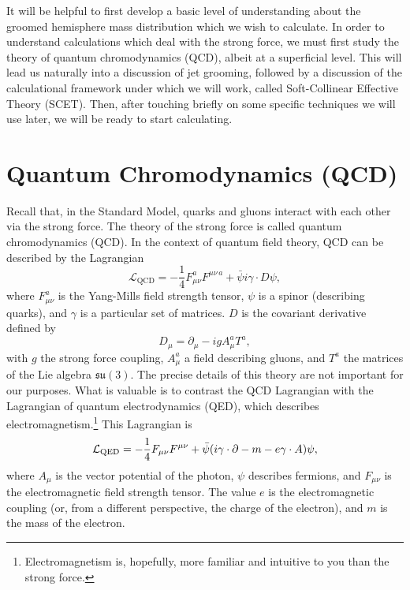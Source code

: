 \documentclass[../thesis.tex]{subfiles}
\providecommand{\cL}{\mathcal{L}}
\providecommand{\su}{\mathfrak{su}}
\begin{document}
	It will be helpful to first develop a basic level of understanding about the groomed hemisphere mass distribution which we wish to calculate. In order to understand calculations which deal with the strong force, we must first study the theory of quantum chromodynamics (QCD), albeit at a superficial level. This will lead us naturally into a discussion of jet grooming, followed by a discussion of the calculational framework under which we will work, called Soft-Collinear Effective Theory (SCET). Then, after touching briefly on some specific techniques we will use later, we will be ready to start calculating.

\section{Quantum Chromodynamics (QCD)}\label{technical-sec:QCD}
	Recall that, in the Standard Model, quarks and gluons interact with each other via the strong force. The theory of the strong force is called quantum chromodynamics (QCD). In the context of quantum field theory, QCD can be described by the Lagrangian \cite{larkoski_elementary_2019-1}
	\begin{equation}\label{technical-eq:QCD Lagrangian}
		\cL_{\mathrm{QCD}} = -\frac{1}{4} F_{\mu\nu}^a F^{\mu \nu\,a} + \bar \psi i \gamma \cdot D \psi,
	\end{equation}
	where $F_{\mu\nu}^a$ is the Yang-Mills field strength tensor, $\psi$ is a spinor (describing quarks), and $\gamma$ is a particular set of matrices. $D$ is the covariant derivative defined by
	\begin{equation}
		D_\mu = \partial_\mu - i g A_\mu^a T^a,
	\end{equation}
	with $g$ the strong force coupling, $A_\mu^a$ a field describing gluons, and $T^a$ the matrices of the Lie algebra $\su(3)$. The precise details of this theory are not important for our purposes. What is valuable is to contrast the QCD Lagrangian with the Lagrangian of quantum electrodynamics (QED), which describes electromagnetism.\footnote{Electromagnetism is, hopefully, more familiar and intuitive to you than the strong force.} This Lagrangian is \cite{larkoski_elementary_2019-1}
	\begin{equation}\label{technical-eq:QED Lagrangian}
		\cL_{\mathrm{QED}} = -\frac{1}{4} F_{\mu\nu} F^{\mu \nu} + \bar \psi \qty(i \gamma \cdot \partial - m - e\gamma \cdot A)\psi,
	\end{equation}
	where $A_\mu$ is the vector potential of the photon, $\psi$ describes fermions, and $F_{\mu\nu}$ is the electromagnetic field strength tensor. The value $e$ is the electromagnetic coupling (or, from a different perspective, the charge of the electron), and $m$ is the mass of the electron.
\end{document}
